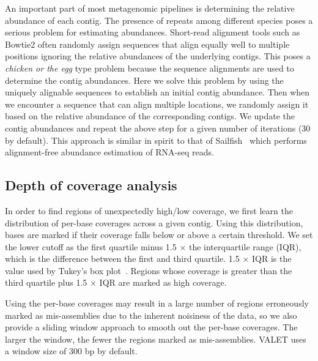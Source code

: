 \documentclass{bioinfo}
\begin{document}
An important part of most metagenomic pipelines is determining the relative abundance of each contig.
The presence of repeats among different species poses a serious problem for estimating abundances.
Short-read alignment tools such as Bowtie2 often randomly assign sequences that align equally well to multiple positions ignoring the relative abundances of the underlying contigs.
This poses a \emph{chicken or the egg} type problem because the sequence alignments are used to determine the contig abundances.
Here we solve this problem by using the uniquely alignable sequences to establish an initial contig abundance.
Then when we encounter a sequence that can align multiple locations, we randomly assign it based on the relative abundance of the corresponding contigs.
We update the contig abundances and repeat the above step for a given number of iterations (30 by default).
This approach is similar in spirit to that of Sailfish~\citep{patro2014sailfish} which performs alignment-free abundance estimation of RNA-seq reads.

\subsection{Depth of coverage analysis}

In order to find regions of unexpectedly high/low coverage, we first learn the distribution of per-base coverages across a given contig.  Using this distribution, bases are marked if their coverage falls below or above a certain threshold.  We set the lower cutoff as the first quartile minus 1.5 $\times$ the interquartile range (IQR), which is the difference between the first and third quartile. 1.5 $\times$ IQR is the value used by Tukey’s box plot~\citep{mcgill1978variations}.  Regions whose coverage is greater than the third quartile plus 1.5 $\times$ IQR are marked as high coverage.

Using the per-base coverages may result in a large number of regions erroneously marked as mis-assemblies due to the inherent noisiness of the data, so we also provide a sliding window approach to smooth out the per-base coverages. The larger the window, the fewer the regions marked as mis-assemblies.
VALET uses a window size of 300 bp by default.
\end{document}
